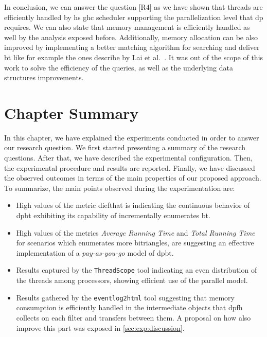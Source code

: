 In conclusion, we can answer the question [R4] as we have shown that threads are efficiently handled by \acrshort{hs} \acrshort{ghc} scheduler supporting the parallelization level that \acrshort{dp} requires. 
We can also state that memory management is efficiently handled as well by the analysis exposed before.
Additionally, memory allocation can be also improved by implementing a better matching algorithm for searching and deliver \acrshort{bt} like for example the ones describe by Lai et al.~\cite{Lai}. 
It was out of the scope of this work to solve the efficiency of the queries, as well as the underlying data structures improvements. 


\section{Chapter Summary}
In this chapter, we have explained the experiments conducted in order to answer our research question.
We first started presenting a summary of the research questions. After that, we have described the experimental configuration.
Then, the experimental procedure and results are reported. Finally, we have discussed the observed outcomes in terms of the main properties of our proposed approach.
To summarize, the main points observed during the experimentation are:
\begin{itemize}
  \item High values of the metric dief\@t that is indicating the continuous behavior of \acrshort{dpbt} exhibiting its capability of incrementally enumerates \acrshort{bt}.
  \item High values of the metrics \emph{Average Running Time} and \emph{Total Running Time} for scenarios which enumerates more bitriangles, are suggesting an effective implementation of a \emph{pay-as-you-go} model of \acrshort{dpbt}.
  \item Results captured by the \texttt{ThreadScope} tool indicating an even distribution of the threads among processors, showing efficient use of the parallel model.
  \item Results gathered by the \texttt{eventlog2html} tool suggesting that memory consumption is efficiently handled in the intermediate objects that \acrshort{dpfh} collects on each filter and transfers between them. A proposal on how also improve this part was exposed in \autoref{sec:exp:discussion}.
\end{itemize} 
